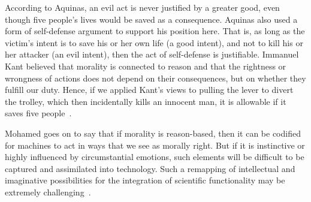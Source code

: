 According to Aquinas, an evil act is never justified by a greater good, even though five people’s lives would be saved as a consequence. Aquinas also used a form of self-defense argument to support his position here. That is, as long as the victim’s intent is to save his or her own life (a good intent), and not to kill his or her attacker (an evil intent), then the act of self-defense is justifiable. Immanuel Kant believed that morality is connected to reason and that the rightness or wrongness of actions does not depend on their consequences, but on whether they fulfill our duty. Hence, if we applied Kant’s views to pulling the lever to divert the trolley, which then incidentally kills an innocent man, it is allowable if it saves five people~\cite{260105620200101}.

Mohamed goes on to say that if morality is reason-based, then it can be codified for machines to act in ways that we see as morally right. But if it is instinctive or highly influenced by circumstantial emotions, such elements will be difficult to be captured and assimilated into technology. Such a remapping of intellectual and imaginative possibilities for the integration of scientific functionality may be extremely challenging~\cite{260105620200101}.

